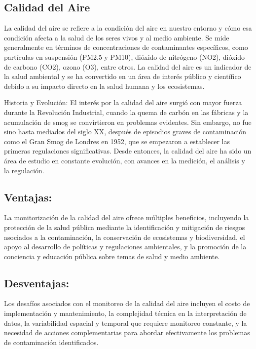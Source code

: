 \subsection{Calidad del Aire}
La calidad del aire se refiere a la condición del aire en nuestro entorno y cómo esa condición afecta a la salud de los seres vivos y al medio ambiente. Se mide generalmente en términos de concentraciones de contaminantes específicos, como partículas en suspensión (PM2.5 y PM10), dióxido de nitrógeno (NO2), dióxido de carbono (CO2), ozono (O3), entre otros. La calidad del aire es un indicador de la salud ambiental y se ha convertido en un área de interés público y científico debido a su impacto directo en la salud humana y los ecosistemas.

Historia y Evolución:
El interés por la calidad del aire surgió con mayor fuerza durante la Revolución Industrial, cuando la quema de carbón en las fábricas y la acumulación de smog se convirtieron en problemas evidentes. Sin embargo, no fue sino hasta mediados del siglo XX, después de episodios graves de contaminación como el Gran Smog de Londres en 1952, que se empezaron a establecer las primeras regulaciones significativas. Desde entonces, la calidad del aire ha sido un área de estudio en constante evolución, con avances en la medición, el análisis y la regulación.

\subsection{Ventajas:}

La monitorización de la calidad del aire ofrece múltiples beneficios, incluyendo la protección de la salud pública mediante la identificación y mitigación de riesgos asociados a la contaminación, la conservación de ecosistemas y biodiversidad, el apoyo al desarrollo de políticas y regulaciones ambientales, y la promoción de la conciencia y educación pública sobre temas de salud y medio ambiente.

\subsection{Desventajas:}

Los desafíos asociados con el monitoreo de la calidad del aire incluyen el costo de implementación y mantenimiento, la complejidad técnica en la interpretación de datos, la variabilidad espacial y temporal que requiere monitoreo constante, y la necesidad de acciones complementarias para abordar efectivamente los problemas de contaminación identificados.

